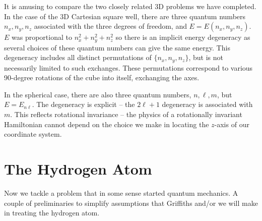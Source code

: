 It is amusing to compare the two closely related 3D problems we have completed.
In the case of the 3D Cartesian square well, there are three quantum numbers
$n_x, n_y, n_z$ associated with the three degrees of freedom, and $E = E (n_x,
n_y, n_z)$.  $E$ was proportional to $n_x^2 + n_y^2+ n_z^2$ so there is an
implicit energy degeneracy as several choices of these quantum numbers can
give the same energy. This degeneracy includes all distinct permutations of
$\{n_x, n_y, n_z\}$, but is not necessarily limited to such exchanges. These
permutations correspond to various 90-degree rotations of the cube into itself,
exchanging the axes. 

In the spherical case, there are also three quantum
numbers,  $n, \ell , m$, but $E = E_{n \ell }$. The degeneracy is explicit -- the
$2\ell +1$ degeneracy is associated with $m$. This reflects rotational
invariance -- the physics of a rotationally invariant Hamiltonian cannot
depend on the choice we make in locating the $z$-axis of our coordinate system. 

\section{The Hydrogen Atom}


Now we tackle a problem that in some sense started quantum mechanics. A couple
of preliminaries to simplify assumptions that Griffiths and/or we will make in
treating the hydrogen atom. 

